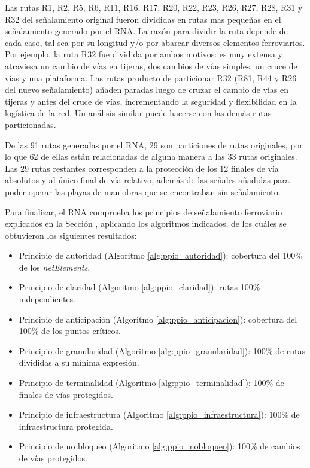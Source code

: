     Las rutas R1, R2, R5, R6, R11, R16, R17, R20, R22, R23, R26, R27, R28, R31 y R32 del señalamiento original fueron divididas en rutas mas pequeñas en el señalamiento generado por el RNA. La razón para dividir la ruta depende de cada caso, tal sea por su longitud y/o por abarcar diversos elementos ferroviarios. Por ejemplo, la ruta R32 fue dividida por ambos motivos: es muy extensa y atraviesa un cambio de vías en tijeras, dos cambios de vías simples, un cruce de vías y una plataforma. Las rutas producto de particionar R32 (R81, R44 y R26 del nuevo señalamiento) añaden paradas luego de cruzar el cambio de vías en tijeras y antes del cruce de vías, incrementando la seguridad y flexibilidad en la logística de la red. Un análisis similar puede hacerse con las demás rutas particionadas.
    
    De las 91 rutas generadas por el RNA, 29 son particiones de rutas originales, por lo que 62 de ellas están relacionadas de alguna manera a las 33 rutas originales. Las 29 rutas restantes corresponden a la protección de los 12 finales de vía absolutos y al único final de vía relativo, además de las señales añadidas para poder operar las playas de maniobras que se encontraban sin señalamiento.
    
    Para finalizar, el RNA comprueba los principios de señalamiento ferroviario explicados en la Sección \label{sec:validar_principios}, aplicando los algoritmos indicados, de los cuáles se obtuvieron los siguientes resultados:
    
    \begin{itemize}
    	\item Principio de autoridad (Algoritmo \ref{alg:ppio_autoridad}): cobertura del 100\% de los \textit{netElements}.
    	\item Principio de claridad (Algoritmo \ref{alg:ppio_claridad}): rutas 100\% independientes.
    	\item Principio de anticipación (Algoritmo \ref{alg:ppio_anticipacion}): cobertura del 100\% de los puntos críticos.
    	\item Principio de granularidad (Algoritmo \ref{alg:ppio_granularidad}): 100\% de rutas divididas a su mínima expresión.
    	\item Principio de terminalidad (Algoritmo \ref{alg:ppio_terminalidad}): 100\% de finales de vías protegidos.
    	\item Principio de infraestructura (Algoritmo \ref{alg:ppio_infraestructura}): 100\% de infraestructura protegida.
    	\item Principio de no bloqueo (Algoritmo \ref{alg:ppio_nobloqueo}): 100\% de cambios de vías protegidos.
    \end{itemize}	